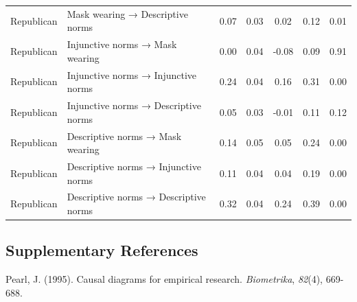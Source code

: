 \documentclass[
  man, donotrepeattitle,floatsintext]{apa6}
\begin{document}
\begin{center}
\begin{ThreePartTable}
\begin{longtable}{llccccc}
Republican & Mask wearing → Descriptive norms & 0.07 & 0.03 & 0.02 & 0.12 & 0.01\\
Republican & Injunctive norms → Mask wearing & 0.00 & 0.04 & -0.08 & 0.09 & 0.91\\
Republican & Injunctive norms → Injunctive norms & 0.24 & 0.04 & 0.16 & 0.31 & 0.00\\
Republican & Injunctive norms → Descriptive norms & 0.05 & 0.03 & -0.01 & 0.11 & 0.12\\
Republican & Descriptive norms → Mask wearing & 0.14 & 0.05 & 0.05 & 0.24 & 0.00\\
Republican & Descriptive norms → Injunctive norms & 0.11 & 0.04 & 0.04 & 0.19 & 0.00\\
Republican & Descriptive norms → Descriptive norms & 0.32 & 0.04 & 0.24 & 0.39 & 0.00\\
\bottomrule
\end{longtable}

\end{ThreePartTable}
\end{center}

\newpage
\setlength\parindent{0pt}

\hypertarget{supplementary-references}{%
\subsection{Supplementary References}\label{supplementary-references}}

Pearl, J. (1995). Causal diagrams for empirical research. \emph{Biometrika}, \emph{82}(4), 669-688.
\end{document}
